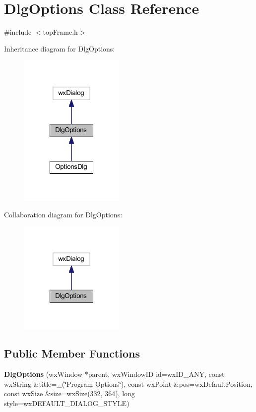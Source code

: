 \hypertarget{class_dlg_options}{\section{Dlg\-Options Class Reference}
\label{class_dlg_options}
}


{\ttfamily \#include $<$top\-Frame.\-h$>$}



Inheritance diagram for Dlg\-Options\-:\nopagebreak
\begin{figure}[H]
\begin{center}
\leavevmode
\includegraphics[width=144pt]{class_dlg_options__inherit__graph}
\end{center}
\end{figure}


Collaboration diagram for Dlg\-Options\-:\nopagebreak
\begin{figure}[H]
\begin{center}
\leavevmode
\includegraphics[width=144pt]{class_dlg_options__coll__graph}
\end{center}
\end{figure}
\subsection*{Public Member Functions}
\begin{DoxyCompactItemize}
\item 
\hypertarget{class_dlg_options_adc03c273f743697a2346cec1f3b34efa}{{\bfseries Dlg\-Options} (wx\-Window $\ast$parent, wx\-Window\-I\-D id=wx\-I\-D\-\_\-\-A\-N\-Y, const wx\-String \&title=\-\_\-(\char`\"{}Program Options\char`\"{}), const wx\-Point \&pos=wx\-Default\-Position, const wx\-Size \&size=wx\-Size(332, 364), long style=wx\-D\-E\-F\-A\-U\-L\-T\-\_\-\-D\-I\-A\-L\-O\-G\-\_\-\-S\-T\-Y\-L\-E)}\label{class_dlg_options_adc03c273f743697a2346cec1f3b34efa}

\end{DoxyCompactItemize}
